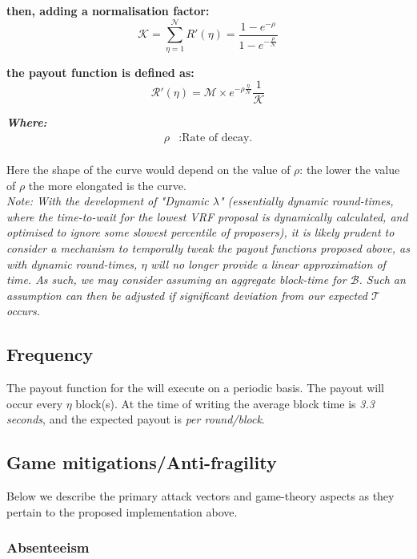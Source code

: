 \documentclass[11pt,a4paper]{article}
\begin{document}
\textbf{then, adding a normalisation factor:}
\[
\mathcal{K} = \sum_{\eta=1}^\mathcal{N}R'(\eta)= \frac{1-e^{-\rho}}{1-e^{-\frac{\rho}{\mathcal{N}}}}
\]

\textbf{the payout function is defined as:}
\[
\mathcal{R'}(\eta)= \mathcal{M}\times e^{-\rho\frac{\eta}{\mathcal{N}}} \frac{1}{\mathcal{K}}
\]

\textbf{\emph{Where:}}
\begin{align*}
\rho & : \text{Rate of decay.} \\
\end{align*}

Here the shape of the curve would depend on the value of \(\rho\): the lower the value of \(\rho\) the more elongated is the curve. \\

\emph{Note: With the development of "Dynamic $\lambda$" (essentially dynamic round-times, where the time-to-wait for the
lowest VRF proposal is dynamically calculated, and optimised to ignore some slowest percentile of proposers), it is 
likely prudent to consider a mechanism to temporally tweak the payout functions proposed above, as with dynamic 
round-times, $\eta$ will no longer provide a linear approximation of time. As such, we may consider assuming an 
aggregate block-time for $\mathcal{B}$. Such an assumption can then be adjusted if significant deviation from our 
expected $\mathcal{T}$ occurs.}

\subsection{Frequency}
The payout function for the  will execute on a periodic basis. The payout will occur every 
$\eta$ block(s). At the time of writing the average block time is \emph{3.3 seconds}, and the expected payout is 
\textit{per round/block}. 

\pagebreak

\subsection{Game mitigations/Anti-fragility}
Below we describe the primary attack vectors and game-theory aspects as they pertain to the proposed implementation 
above.

\subsubsection{Absenteeism} \label{subsubsec:absenteeism}
\end{document}
